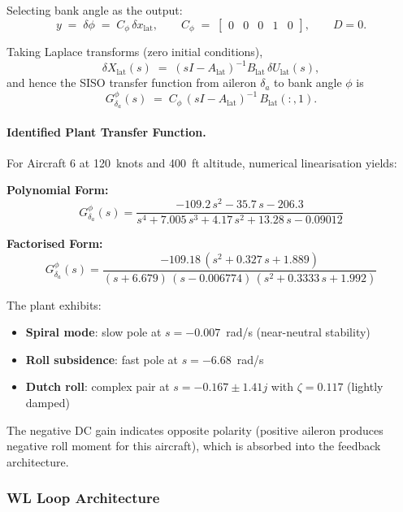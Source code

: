 Selecting bank angle as the output:
\[
y \;=\; \delta\phi \;=\; C_\phi\,\delta x_{\mathrm{lat}},
\qquad
C_\phi \;=\; \begin{bmatrix} 0 & 0 & 0 & 1 & 0 \end{bmatrix},
\qquad D=0.
\]

Taking Laplace transforms (zero initial conditions),
\[
\delta X_{\mathrm{lat}}(s) \;=\; (sI - A_{\mathrm{lat}})^{-1} B_{\mathrm{lat}} \,\delta U_{\mathrm{lat}}(s),
\]
and hence the SISO transfer function from aileron \(\delta_a\) to bank angle \(\phi\) is
\[
G^{\phi}_{\delta_a}(s)
\;=\;
C_\phi \,(sI - A_{\mathrm{lat}})^{-1}\, B_{\mathrm{lat}}(:,1).
\]

\paragraph{Identified Plant Transfer Function.}
For Aircraft 6 at 120~knots and 400~ft altitude, numerical linearisation yields:

\textbf{Polynomial Form:}
\begin{equation}
G^{\phi}_{\delta_a}(s)
= \frac{-109.2\,s^{2} - 35.7\,s - 206.3}
        {s^{4} + 7.005\,s^{3} + 4.17\,s^{2} + 13.28\,s - 0.09012}
\label{eq:Gphi_poly}
\end{equation}

\textbf{Factorised Form:}
\begin{equation}
G^{\phi}_{\delta_a}(s)
= \frac{-109.18\,(s^{2} + 0.327\,s + 1.889)}
        {(s+6.679)\,(s-0.006774)\,(s^{2} + 0.3333\,s + 1.992)}
\label{eq:Gphi_zpk}
\end{equation}

The plant exhibits:
\begin{itemize}
\item \textbf{Spiral mode}: slow pole at $s=-0.007$~rad/s (near-neutral stability)
\item \textbf{Roll subsidence}: fast pole at $s=-6.68$~rad/s
\item \textbf{Dutch roll}: complex pair at $s = -0.167 \pm 1.41j$ with $\zeta=0.117$ (lightly damped)
\end{itemize}

The negative DC gain indicates opposite polarity (positive aileron produces negative roll moment for this aircraft), which is absorbed into the feedback architecture.

\subsubsection{WL Loop Architecture}

